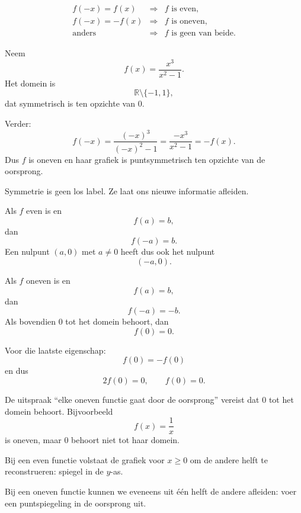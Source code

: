 \documentclass{ximera}
\begin{document}
\[
\boxed{
\begin{array}{rcl}
f(-x)=f(x) &\Rightarrow& f\text{ is even},\\[1mm]
f(-x)=-f(x) &\Rightarrow& f\text{ is oneven},\\[1mm]
\text{anders} &\Rightarrow& f\text{ is geen van beide}.
\end{array}}
\]

\begin{voorbeeld}
Neem
\[
f(x)=\frac{x^3}{x^2-1}.
\]
Het domein is
\[
\mathbb{R}\setminus\{-1,1\},
\]
dat symmetrisch is ten opzichte van \(0\).

Verder:
\[
f(-x)=\frac{(-x)^3}{(-x)^2-1}
=\frac{-x^3}{x^2-1}
=-f(x).
\]
Dus \(f\) is oneven en haar grafiek is puntsymmetrisch ten opzichte van de oorsprong.
\end{voorbeeld}


Symmetrie is geen los label. Ze laat ons nieuwe informatie afleiden.

\begin{eigenschap}
Als \(f\) even is en
\[
f(a)=b,
\]
dan
\[
f(-a)=b.
\]
Een nulpunt \((a,0)\) met \(a\neq0\) heeft dus ook het nulpunt
\[
(-a,0).
\]
\end{eigenschap}

\begin{eigenschap}
Als \(f\) oneven is en
\[
f(a)=b,
\]
dan
\[
f(-a)=-b.
\]
Als bovendien \(0\) tot het domein behoort, dan
\[
f(0)=0.
\]
\end{eigenschap}

Voor die laatste eigenschap:
\[
f(0)=-f(0)
\]
en dus
\[
2f(0)=0,
\qquad f(0)=0.
\]

\begin{opmerking}
De uitspraak ``elke oneven functie gaat door de oorsprong'' vereist dat \(0\)
tot het domein behoort. Bijvoorbeeld
\[
f(x)=\frac1x
\]
is oneven, maar \(0\) behoort niet tot haar domein.
\end{opmerking}


Bij een even functie volstaat de grafiek voor \(x\geq0\) om de andere helft
te reconstrueren: spiegel in de \(y\)-as.

Bij een oneven functie kunnen we eveneens uit één helft de andere afleiden:
voer een puntspiegeling in de oorsprong uit.

\begin{center}
\end{center}
\end{document}
